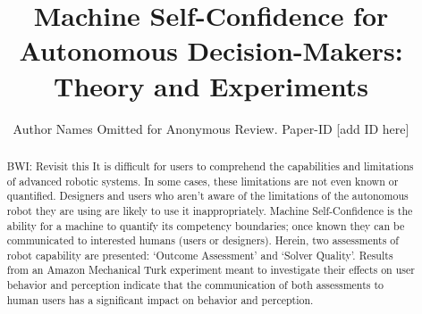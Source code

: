 \documentclass[conference,10pt]{IEEEtran}
\newcommand{\hlb}[1]{{\color{blue} #1}}
\newcommand{\brett}[1]{\hlb{BWI: #1}}
\begin{document}
\title{Machine Self-Confidence for Autonomous Decision-Makers: Theory and Experiments}
\author{Author Names Omitted for Anonymous Review. Paper-ID [add ID here]} 

\maketitle

\begin{abstract}
    \brett{Revisit this}
    It is difficult for users to comprehend the capabilities and limitations of advanced robotic systems. In some cases, these limitations are not even known or quantified. Designers and users who aren't aware of the limitations of the autonomous robot they are using are likely to use it inappropriately. Machine Self-Confidence is the ability for a machine to quantify its competency boundaries; once known they can be communicated to interested humans (users or designers). Herein, two assessments of robot capability are presented: `Outcome Assessment' and `Solver Quality'. Results from an Amazon Mechanical Turk experiment meant to investigate their effects on user behavior and perception indicate that the communication of both assessments to human users has a significant impact on behavior and perception.
\end{abstract}

\IEEEpeerreviewmaketitle











\appendices

\end{document}

